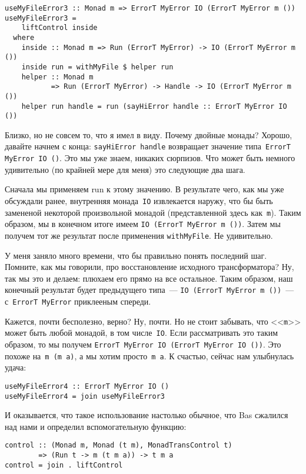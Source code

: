 \begin{lstlisting}
useMyFileError3 :: Monad m => ErrorT MyError IO (ErrorT MyError m ())
useMyFileError3 =
    liftControl inside
  where
    inside :: Monad m => Run (ErrorT MyError) -> IO (ErrorT MyError m ())
    inside run = withMyFile $ helper run
    helper :: Monad m
           => Run (ErrorT MyError) -> Handle -> IO (ErrorT MyError m ())
    helper run handle = run (sayHiError handle :: ErrorT MyError IO ())
\end{lstlisting}

Близко, но не совсем то, что я имел в виду. Почему двойные монады? Хорошо,
давайте начнем с конца: \lstinline'sayHiError handle' возвращает значение
типа~\lstinline'ErrorT MyError IO ()'.
Это мы уже знаем, никаких сюрпизов. Что может быть немного
удивительно (по крайней мере для меня) это следующие два шага.

Сначала мы применяем run к этому значению. В результате чего, как мы уже
обсуждали ранее, внутренняя монада~\lstinline'IO' извлекается наружу, что бы быть замененой
некоторой произвольной монадой (представленной здесь как~\lstinline'm'). Таким образом, мы
в конечном итоге имеем \lstinline'IO (ErrorT MyError m ())'. Затем мы получем тот же
результат после применения \lstinline'withMyFile'. Не удивительно.

У меня заняло много времени, что бы правильно понять последний шаг. Помните,
как мы говорили, про восстановление исходного трансформатора? Ну, так мы это и
делаем: плюхаем его прямо на все остальное. Таким образом, наш конечный
результат будет предыдущего типа~--- \lstinline'IO (ErrorT MyError m ())'~--- с~\lstinline'ErrorT MyError'
приклееным спереди.

Кажется, почти бесполезно, верно? Ну, почти. Но не стоит забывать, что <<\lstinline'm'>>
может быть любой монадой, в том числе~\lstinline'IO'. Если рассматривать это таким образом,
то мы получем \lstinline'ErrorT MyError IO (ErrorT MyError IO ())'. Это похоже на~\lstinline'm (m a)',
а мы хотим просто~\lstinline'm a'. К счастью, сейчас нам улыбнулась удача:

\begin{lstlisting}
useMyFileError4 :: ErrorT MyError IO ()
useMyFileError4 = join useMyFileError3
\end{lstlisting}

И оказывается, что такое использование настолько обычное, что Bas сжалился над
нами и определил вспомогательную функцию:

\begin{lstlisting}
control :: (Monad m, Monad (t m), MonadTransControl t)
        => (Run t -> m (t m a)) -> t m a
control = join . liftControl
\end{lstlisting}

